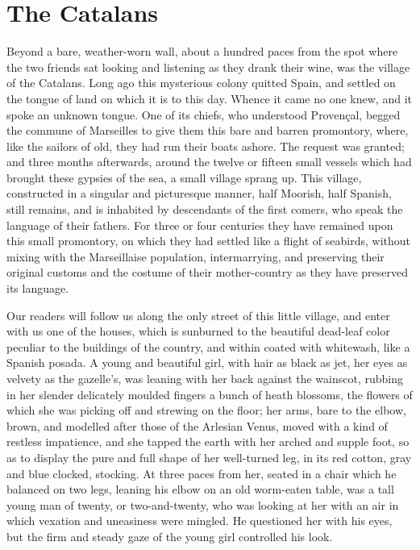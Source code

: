 \chapter{The Catalans}

Beyond a bare, weather-worn wall, about a hundred paces from the spot
where the two friends sat looking and listening as they drank their
wine, was the village of the Catalans. Long ago this mysterious colony
quitted Spain, and settled on the tongue of land on which it is to this
day. Whence it came no one knew, and it spoke an unknown tongue. One of
its chiefs, who understood Provençal, begged the commune of Marseilles
to give them this bare and barren promontory, where, like the sailors
of old, they had run their boats ashore. The request was granted; and
three months afterwards, around the twelve or fifteen small vessels
which had brought these gypsies of the sea, a small village sprang up.
This village, constructed in a singular and picturesque manner, half
Moorish, half Spanish, still remains, and is inhabited by descendants
of the first comers, who speak the language of their fathers. For three
or four centuries they have remained upon this small promontory, on
which they had settled like a flight of seabirds, without mixing with
the Marseillaise population, intermarrying, and preserving their
original customs and the costume of their mother-country as they have
preserved its language.

Our readers will follow us along the only street of this little
village, and enter with us one of the houses, which is sunburned to the
beautiful dead-leaf color peculiar to the buildings of the country, and
within coated with whitewash, like a Spanish posada. A young and
beautiful girl, with hair as black as jet, her eyes as velvety as the
gazelle’s, was leaning with her back against the wainscot, rubbing in
her slender delicately moulded fingers a bunch of heath blossoms, the
flowers of which she was picking off and strewing on the floor; her
arms, bare to the elbow, brown, and modelled after those of the
Arlesian Venus, moved with a kind of restless impatience, and she
tapped the earth with her arched and supple foot, so as to display the
pure and full shape of her well-turned leg, in its red cotton, gray and
blue clocked, stocking. At three paces from her, seated in a chair
which he balanced on two legs, leaning his elbow on an old worm-eaten
table, was a tall young man of twenty, or two-and-twenty, who was
looking at her with an air in which vexation and uneasiness were
mingled. He questioned her with his eyes, but the firm and steady gaze
of the young girl controlled his look.

